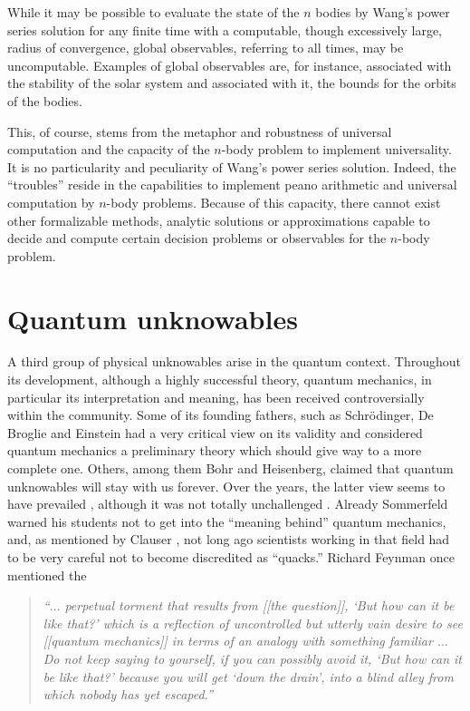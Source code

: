 \documentclass[rmp,amsfonts,showpacs,showkeys]{revtex4}
\begin{document}
While it may be possible to evaluate
the state of the $n$ bodies by Wang's power series solution
for any finite time with a computable,
though excessively large, radius of convergence,
global observables, referring to all times, may be uncomputable.
Examples of global observables are, for instance, associated
with the stability of the solar system and associated with it,
the bounds for the orbits of the bodies.

This, of course,
stems from the metaphor and robustness of universal computation
and the capacity of the $n$-body problem to implement universality.
It is no particularity and peculiarity of Wang's power series solution.
Indeed, the ``troubles'' reside in the capabilities to implement peano arithmetic and
universal computation by $n$-body problems.
Because of this capacity, there cannot exist other formalizable methods,
analytic solutions or approximations capable to decide and compute certain decision problems
or observables for the $n$-body problem.

\section{Quantum unknowables}


A third group of physical unknowables arise in the quantum context.
Throughout its development, although a highly successful theory,
quantum mechanics, in particular its interpretation and meaning,
has been received controversially within the community.
Some of its founding fathers, such as Schr\"odinger,
De Broglie and Einstein had a very critical view on its
validity and considered quantum mechanics a preliminary theory which should give
way to a more complete one.
Others, among them Bohr and Heisenberg,
claimed that quantum unknowables will stay with us forever.
Over the years, the latter view seems to have prevailed
\cite{fuchs-peres}, although it was not totally unchallenged
\cite{jammer:66,jammer1,jammer-92}.
Already Sommerfeld warned his students not to get
into the ``meaning behind'' quantum mechanics,
and, as mentioned by Clauser \cite{clauser-talkvie},
not long ago scientists working in that field
had to be very careful not to become discredited as ``quacks.''
Richard Feynman \cite[p. 129]{feynman-law}
once mentioned the
\begin{quote}
{\em ``$\ldots$ perpetual torment that results
from [[the question]], `But how can it be like that?' which
is a reflection of uncontrolled but utterly vain desire to see
[[quantum mechanics]] in terms of an analogy with something familiar
$\ldots$
Do not keep saying to yourself, if you can possibly avoid it,
`But how can it be like that?'
because you will get `down the drain', into a blind alley from which nobody has yet
escaped.''}
\end{quote}
\end{document}
